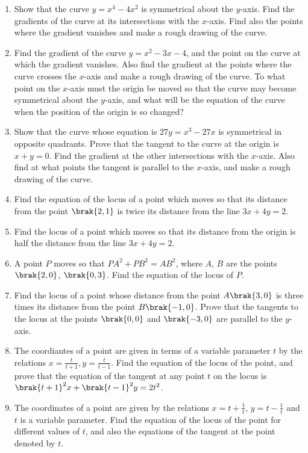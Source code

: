 \begin{enumerate}[1.]
\item Show that the curve $y=x^4-4x^2$ is symmetrical about the $y$-axis.  Find the gradients of the curve at its intersections
with the $x$-axis.  Find also the points where the gradient vanishes and make a rough drawing of the curve.
\item Find the gradient of the curve $y=x^2-3x-4$, and the point on the curve at which the gradient vanishes.  Also find
the gradient at the points where the curve crosses the $x$-axis and make a rough drawing of the curve.  To what
point on the $x$-axis must the origin be moved so that the curve may become symmetrical
about the $y$-axis, and what will be the equation of the curve when the position of the origin
is so changed?
\item Show that the curve whose equation is $27y=x^3-27x$ is symmetrical in opposite quadrants.  Prove that
the tangent to the curve at the origin is $x+y=0$.  Find the gradient at the other intersections with the $x$-axis.  Also
find at what points the tangent is parallel to the $x$-axis, and make a rough drawing of the curve.
\item Find the equation of the locus of a point which moves so that its distance from the point $\brak{2,1}$
is twice its distance from the line $3x+4y=2$.
\item Find the locus of a point which moves so that its distance from the origin is half the  distance from the
line $3x+4y=2$.
\item A point $P$ moves so that $PA^2+PB^2=AB^2$, where $A$, $B$ are the points $\brak{2,0}$, $\brak{0,3}$.  Find the equation of the locus of $P$.
\item Find the locus of a point whose distance from the point $A\brak{3,0}$ is three times its distance from the point $B \brak{-1,0}$.
Prove that the tangents to the locus at the points $\brak{0,0}$ and $\brak{-3,0}$ are parallel to the $y$-axis.
\item The coordiantes of a point are given in terms of a variable parameter $t$ by the relations $x=\frac{t}{t+1}, y = \frac{t}{t-1}$.  Find the equation of the locus
of the point, and prove that the equation of the tangent at any point $t$
on the locus is $\brak{t+1}^2x+\brak{t-1}^2y=2t^2$.
\item The coordinates of a point are given by the relations $x = t + \frac{1}{t}$, $y = t - \frac{1}{t}$ and $t$ is a variable parameter.  Find the
equation of the locus of the point for different values of $t$, and also the equations of the
tangent at the point denoted by $t$.
\end{enumerate}

